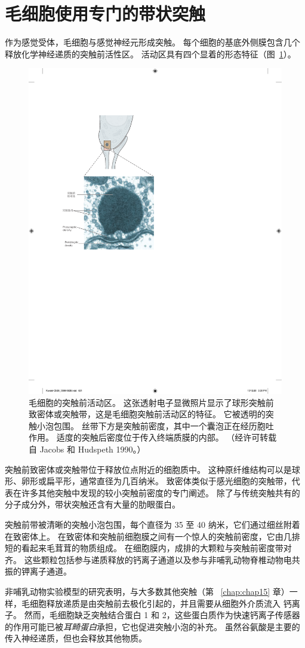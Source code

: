 \section{毛细胞使用专门的带状突触}

作为感觉受体，毛细胞与感觉神经元形成突触。
每个细胞的基底外侧膜包含几个释放化学神经递质的突触前活性区。
活动区具有四个显着的形态特征（图~\ref{fig:26_16}）。


\begin{figure}[htbp]
	\centering
	\includegraphics[width=0.5\linewidth]{chap26/fig_26_16}
	\caption{毛细胞的突触前活动区。 这张透射电子显微照片显示了球形突触前致密体或突触带，这是毛细胞突触前活动区的特征。 它被透明的突触小泡包围。 丝带下方是突触前密度，其中一个囊泡正在经历胞吐作用。 适度的突触后密度位于传入终端质膜的内部。 （经许可转载自 Jacobs 和 Hudspeth 1990。）}
	\label{fig:26_16}
\end{figure}


突触前致密体或突触带位于释放位点附近的细胞质中。
这种原纤维结构可以是球形、卵形或扁平形，通常直径为几百纳米。
致密体类似于感光细胞的突触带，代表在许多其他突触中发现的较小突触前密度的专门阐述。
除了与传统突触共有的分子成分外，带状突触还含有大量的肋眼蛋白。


突触前带被清晰的突触小泡包围，每个直径为 35 至 40 纳米，它们通过细丝附着在致密体上。
在致密体和突触前细胞膜之间有一个惊人的突触前密度，它由几排短的看起来毛茸茸的物质组成。
在细胞膜内，成排的大颗粒与突触前密度带对齐。
这些颗粒包括参与递质释放的钙离子通道以及参与非哺乳动物脊椎动物电共振的钾离子通道。


非哺乳动物实验模型的研究表明，与大多数其他突触（第 ~\ref{chap:chap15} 章）一样，毛细胞释放递质是由突触前去极化引起的，并且需要从细胞外介质流入 钙离子。
然而，毛细胞缺乏突触结合蛋白 1 和 2，这些蛋白质作为快速钙离子传感器的作用可能已被\textit{耳畸蛋白}承担，它也促进突触小泡的补充。
虽然谷氨酸是主要的传入神经递质，但也会释放其他物质。


